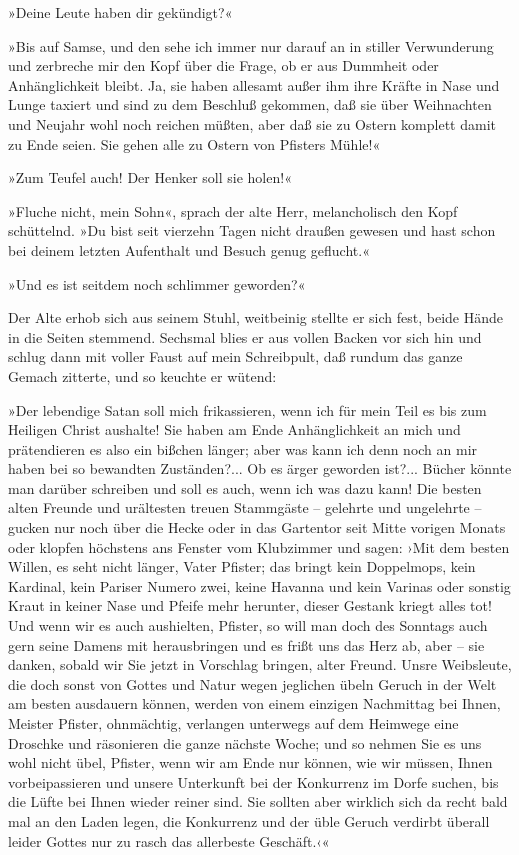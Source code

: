 »Deine Leute haben dir gekündigt?«

»Bis auf Samse, und den sehe ich immer nur darauf an in stiller
Verwunderung und zerbreche mir den Kopf über die Frage, ob er aus
Dummheit oder Anhänglichkeit bleibt. Ja, sie haben allesamt außer
ihm ihre Kräfte in Nase und Lunge taxiert und sind zu dem Beschluß
gekommen, daß sie über Weihnachten und Neujahr wohl noch reichen
müßten, aber daß sie zu Ostern komplett damit zu Ende seien. Sie
gehen alle zu Ostern von Pfisters Mühle!«

»Zum Teufel auch! Der Henker soll sie holen!«

»Fluche nicht, mein Sohn«, sprach der alte Herr, melancholisch den
Kopf schüttelnd. »Du bist seit vierzehn Tagen nicht draußen gewesen
und hast schon bei deinem letzten Aufenthalt und Besuch genug
geflucht.«

»Und es ist seitdem noch schlimmer geworden?«

Der Alte erhob sich aus seinem Stuhl, weitbeinig stellte er sich
fest, beide Hände in die Seiten stemmend. Sechsmal blies er aus
vollen Backen vor sich hin und schlug dann mit voller Faust auf
mein Schreibpult, daß rundum das ganze Gemach zitterte, und so
keuchte er wütend:

»Der lebendige Satan soll mich frikassieren, wenn ich für mein Teil
es bis zum Heiligen Christ aushalte! Sie haben am Ende
Anhänglichkeit an mich und prätendieren es also ein bißchen länger;
aber was kann ich denn noch an mir haben bei so bewandten
Zuständen?... Ob es ärger geworden ist?... Bücher könnte man
darüber schreiben und soll es auch, wenn ich was dazu kann! Die
besten alten Freunde und urältesten treuen Stammgäste – gelehrte
und ungelehrte – gucken nur noch über die Hecke oder in das
Gartentor seit Mitte vorigen Monats oder klopfen höchstens ans
Fenster vom Klubzimmer und sagen: ›Mit dem besten Willen, es seht
nicht länger, Vater Pfister; das bringt kein Doppelmops, kein
Kardinal, kein Pariser Numero zwei, keine Havanna und kein Varinas
oder sonstig Kraut in keiner Nase und Pfeife mehr herunter, dieser
Gestank kriegt alles tot! Und wenn wir es auch aushielten, Pfister,
so will man doch des Sonntags auch gern seine Damens mit
herausbringen und es frißt uns das Herz ab, aber – sie danken,
sobald wir Sie jetzt in Vorschlag bringen, alter Freund. Unsre
Weibsleute, die doch sonst von Gottes und Natur wegen jeglichen
übeln Geruch in der Welt am besten ausdauern können, werden von
einem einzigen Nachmittag bei Ihnen, Meister Pfister, ohnmächtig,
verlangen unterwegs auf dem Heimwege eine Droschke und räsonieren
die ganze nächste Woche; und so nehmen Sie es uns wohl nicht übel,
Pfister, wenn wir am Ende nur können, wie wir müssen, Ihnen
vorbeipassieren und unsere Unterkunft bei der Konkurrenz im Dorfe
suchen, bis die Lüfte bei Ihnen wieder reiner sind. Sie sollten
aber wirklich sich da recht bald mal an den Laden legen, die
Konkurrenz und der üble Geruch verdirbt überall leider Gottes nur
zu rasch das allerbeste Geschäft.‹«

